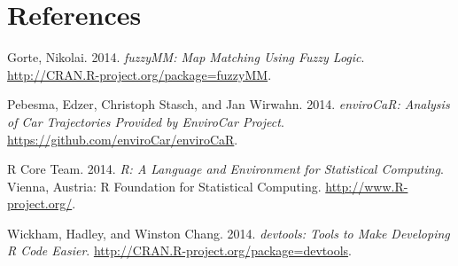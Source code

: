 \documentclass[]{article}
\begin{document}
\section*{References}\label{references}

Gorte, Nikolai. 2014. \emph{fuzzyMM: Map Matching Using Fuzzy Logic}.
\url{http://CRAN.R-project.org/package=fuzzyMM}.

Pebesma, Edzer, Christoph Stasch, and Jan Wirwahn. 2014.
\emph{enviroCaR: Analysis of Car Trajectories Provided by EnviroCar
Project}. \url{https://github.com/enviroCar/enviroCaR}.

R Core Team. 2014. \emph{R: A Language and Environment for Statistical
Computing}. Vienna, Austria: R Foundation for Statistical Computing.
\url{http://www.R-project.org/}.

Wickham, Hadley, and Winston Chang. 2014. \emph{devtools: Tools to Make
Developing R Code Easier}.
\url{http://CRAN.R-project.org/package=devtools}.
\end{document}
